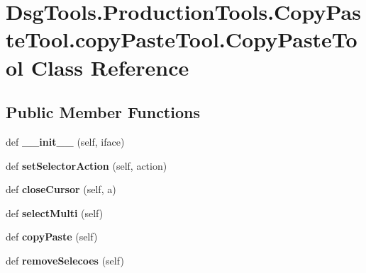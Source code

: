 \hypertarget{class_dsg_tools_1_1_production_tools_1_1_copy_paste_tool_1_1copy_paste_tool_1_1_copy_paste_tool}{}\section{Dsg\+Tools.\+Production\+Tools.\+Copy\+Paste\+Tool.\+copy\+Paste\+Tool.\+Copy\+Paste\+Tool Class Reference}
\label{class_dsg_tools_1_1_production_tools_1_1_copy_paste_tool_1_1copy_paste_tool_1_1_copy_paste_tool}
\subsection*{Public Member Functions}
\begin{DoxyCompactItemize}
\item 
\mbox{\label{class_dsg_tools_1_1_production_tools_1_1_copy_paste_tool_1_1copy_paste_tool_1_1_copy_paste_tool_a06d62f1cb00a5af7067bafc1eceb3271}} 
def {\bfseries \+\_\+\+\_\+init\+\_\+\+\_\+} (self, iface)
\item 
\mbox{\label{class_dsg_tools_1_1_production_tools_1_1_copy_paste_tool_1_1copy_paste_tool_1_1_copy_paste_tool_ac38ec4ca64a7c2f10a9db4e825263ad0}} 
def {\bfseries set\+Selector\+Action} (self, action)
\item 
\mbox{\label{class_dsg_tools_1_1_production_tools_1_1_copy_paste_tool_1_1copy_paste_tool_1_1_copy_paste_tool_a09de335a90ce194a48e8f9d2aa1dbe55}} 
def {\bfseries close\+Cursor} (self, a)
\item 
\mbox{\label{class_dsg_tools_1_1_production_tools_1_1_copy_paste_tool_1_1copy_paste_tool_1_1_copy_paste_tool_a015d75523cd5ec4bf4114fdf1f9214e8}} 
def {\bfseries select\+Multi} (self)
\item 
\mbox{\label{class_dsg_tools_1_1_production_tools_1_1_copy_paste_tool_1_1copy_paste_tool_1_1_copy_paste_tool_ae54f2e7a3fe945e05f4f5f1d4cc48eb8}} 
def {\bfseries copy\+Paste} (self)
\item 
\mbox{\label{class_dsg_tools_1_1_production_tools_1_1_copy_paste_tool_1_1copy_paste_tool_1_1_copy_paste_tool_a26a36011d8aa44328c9204cc36663356}} 
def {\bfseries remove\+Selecoes} (self)
\end{DoxyCompactItemize}
